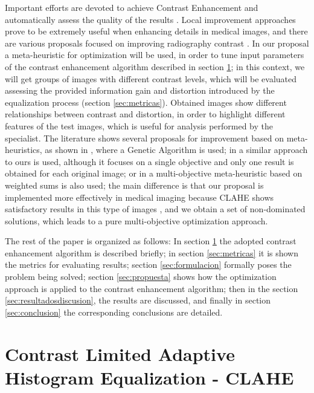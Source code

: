 \documentclass[spanish,twocolumn]{article}
\begin{document}
Important efforts are devoted to achieve Contrast Enhancement and automatically assess the quality of the results \cite{LTG,6963384,1658094,7056527}. Local improvement approaches prove to be extremely useful when enhancing details in medical images, and there are various proposals focused on improving radiography contrast \cite{1625082,4712472,5360176}. In our proposal a meta-heuristic for optimization will be used, in order to tune input parameters of the contrast enhancement algorithm described in section \ref{sec:clahe}; in this context, we will get groups of images with different contrast levels, which will be evaluated assessing the provided information gain and distortion introduced by the equalization process (section \ref{sec:metricas}). Obtained images show different relationships between contrast and distortion, in order to highlight different features of the test images, which is useful for analysis performed by the specialist. The literature shows several proposals for improvement based on meta-heuristics, as shown in \cite{Hashemi20101816}, where a Genetic Algorithm is used; in \cite{morebrizuela2014} a similar approach to ours is used, although it focuses on a single objective and only one result is obtained for each original image; or in \cite{Shanmugavadivu2014243} a multi-objective meta-heuristic based on weighted sums is also used; the main difference is that our proposal is implemented more effectively in medical imaging because CLAHE shows satisfactory results in this type of images \cite{reza2004,5360176}, and we obtain a set of non-dominated solutions, which leads to a pure multi-objective optimization approach.

The rest of the paper is organized as follows: In section \ref{sec:clahe} the adopted contrast enhancement algorithm is described briefly; in section \ref{sec:metricas} it is shown the metrics for evaluating results; section \ref{sec:formulacion} formally poses the problem being solved; section \ref{sec:propuesta} shows how the optimization approach is applied to the contrast enhancement algorithm; then in the section \ref{sec:resultadosdiscusion}, the results are discussed, and finally in section \ref{sec:conclusion} the corresponding conclusions are detailed.


\section{Contrast Limited Adaptive Histogram Equalization - CLAHE}
\label{sec:clahe}
\end{document}
